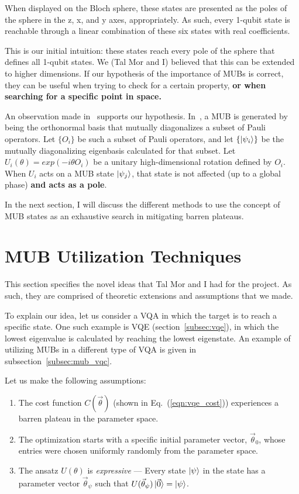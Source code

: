 \documentclass[a4paper,12pt]{article}
\newcommand{\thetas}{\vec{\theta}}
\begin{document}
When displayed on the Bloch sphere, these states are presented as the poles of the sphere in the z, x, and y axes, appropriately. As such, every 1-qubit state is reachable through a linear combination of these six states with real coefficients.

This is our initial intuition: these states reach every pole of the sphere that defines all 1-qubit states.
We (Tal Mor and I) believed that this can be extended to higher dimensions. If our hypothesis of the importance of MUBs is correct, they can be useful when trying to check for a certain property, \textbf{or when searching for a specific point in space.}

An observation made in~\cite{lawrence_mutually_2002} supports our hypothesis.
In~\cite{lawrence_mutually_2002}, a MUB is generated by being the orthonormal basis that mutually diagonalizes a subset of Pauli operators.
Let $\{O_i\}$ be such a subset of Pauli operators, and let $\{\ket{\psi_i}\}$ be the mutually diagonalizing eigenbasis calculated for that subset.
Let $U_i(\theta) = exp(-i\theta O_i)$ be a unitary high-dimensional rotation defined by $O_i$.
When $U_i$ acts on a MUB state $\ket{\psi_j}$, that state is not affected (up to a global phase) \textbf{and acts as a pole}.

In the next section, I will discuss the different methods to use the concept of MUB states as an exhaustive search in mitigating barren plateaus.


\section{MUB Utilization Techniques} \label{sec:mub_use}
This section specifies the novel ideas that Tal Mor and I had for the project. As such, they are comprised of theoretic extensions and assumptions that we made.

To explain our idea, let us consider a VQA in which the target is to reach a specific state.
One such example is VQE (section~\ref{subsec:vqe}), in which the lowest eigenvalue is calculated by reaching the lowest eigenstate.
An example of utilizing MUBs in a different type of VQA is given in subsection~\ref{subsec:mub_vqc}.

Let us make the following assumptions:
\begin{enumerate}
    \item The cost function $C(\thetas)$ (shown in Eq.~(\ref{eqn:vqe_cost})) experiences a barren plateau in the parameter space. 
    \item The optimization starts with a specific initial parameter vector, $\thetas_0$, whose entries were chosen uniformly randomly from the parameter space.
    \item The ansatz $U(\theta)$ is \emph{expressive} --- Every state $\ket{\psi}$ in the state has a parameter vector $\thetas_\psi$ such that $U(\thetas_\psi)\ket{\vec{0}} = \ket{\psi}$.
    \label{itm:expressive}
\end{enumerate}
\end{document}
